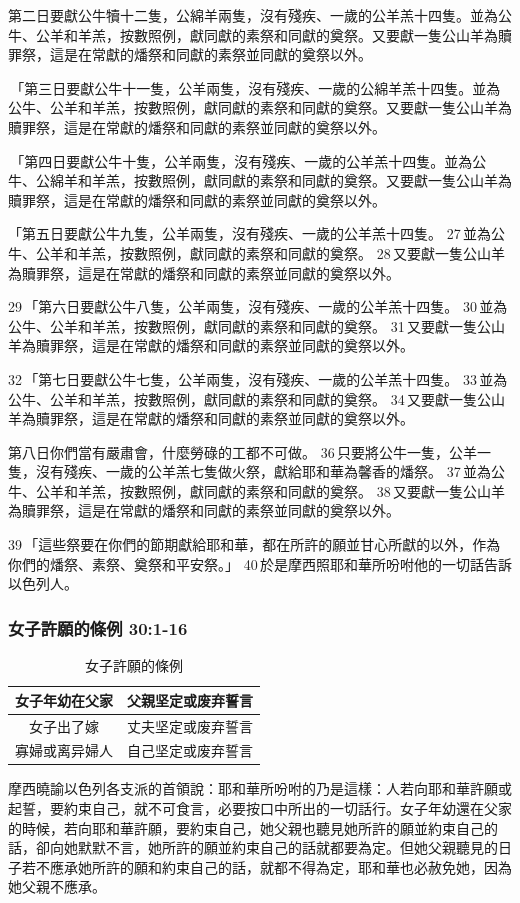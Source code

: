 第二日要獻公牛犢十二隻，公綿羊兩隻，沒有殘疾、一歲的公羊羔十四隻。並為公牛、公羊和羊羔，按數照例，獻同獻的素祭和同獻的奠祭。又要獻一隻公山羊為贖罪祭，這是在常獻的燔祭和同獻的素祭並同獻的奠祭以外。

 「第三日要獻公牛十一隻，公羊兩隻，沒有殘疾、一歲的公綿羊羔十四隻。並為公牛、公羊和羊羔，按數照例，獻同獻的素祭和同獻的奠祭。又要獻一隻公山羊為贖罪祭，這是在常獻的燔祭和同獻的素祭並同獻的奠祭以外。

 「第四日要獻公牛十隻，公羊兩隻，沒有殘疾、一歲的公羊羔十四隻。並為公牛、公綿羊和羊羔，按數照例，獻同獻的素祭和同獻的奠祭。又要獻一隻公山羊為贖罪祭，這是在常獻的燔祭和同獻的素祭並同獻的奠祭以外。

「第五日要獻公牛九隻，公羊兩隻，沒有殘疾、一歲的公羊羔十四隻。 27 並為公牛、公羊和羊羔，按數照例，獻同獻的素祭和同獻的奠祭。 28 又要獻一隻公山羊為贖罪祭，這是在常獻的燔祭和同獻的素祭並同獻的奠祭以外。

29 「第六日要獻公牛八隻，公羊兩隻，沒有殘疾、一歲的公羊羔十四隻。 30 並為公牛、公羊和羊羔，按數照例，獻同獻的素祭和同獻的奠祭。 31 又要獻一隻公山羊為贖罪祭，這是在常獻的燔祭和同獻的素祭並同獻的奠祭以外。

32 「第七日要獻公牛七隻，公羊兩隻，沒有殘疾、一歲的公羊羔十四隻。 33 並為公牛、公羊和羊羔，按數照例，獻同獻的素祭和同獻的奠祭。 34 又要獻一隻公山羊為贖罪祭，這是在常獻的燔祭和同獻的素祭並同獻的奠祭以外。

第八日你們當有嚴肅會，什麼勞碌的工都不可做。 36 只要將公牛一隻，公羊一隻，沒有殘疾、一歲的公羊羔七隻做火祭，獻給耶和華為馨香的燔祭。 37 並為公牛、公羊和羊羔，按數照例，獻同獻的素祭和同獻的奠祭。 38 又要獻一隻公山羊為贖罪祭，這是在常獻的燔祭和同獻的素祭並同獻的奠祭以外。

39 「這些祭要在你們的節期獻給耶和華，都在所許的願並甘心所獻的以外，作為你們的燔祭、素祭、奠祭和平安祭。」 40 於是摩西照耶和華所吩咐他的一切話告訴以色列人。

\subsubsection{女子許願的條例 30:1-16 }
\begin{table}
\centering
\vspace*{-8mm}
\begin{tabular}{|c|c|}\hline\hline
 
女子年幼在父家 &父親坚定或废弃誓言 \\ \hline
女子出了嫁       &丈夫坚定或废弃誓言 \\ \hline 
寡婦或离异婦人 &自己坚定或废弃誓言 \\ \hline\hline
\end{tabular}
\caption{女子許願的條例}
\label{tab:xinnian}
\end{table}
摩西曉諭以色列各支派的首領說：耶和華所吩咐的乃是這樣：人若向耶和華許願或起誓，要約束自己，就不可食言，必要按口中所出的一切話行。女子年幼還在父家的時候，若向耶和華許願，要約束自己，她父親也聽見她所許的願並約束自己的話，卻向她默默不言，她所許的願並約束自己的話就都要為定。但她父親聽見的日子若不應承她所許的願和約束自己的話，就都不得為定，耶和華也必赦免她，因為她父親不應承。

